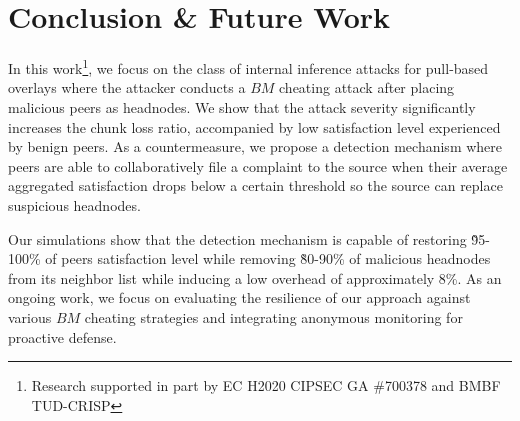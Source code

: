\section{Conclusion \& Future Work}
\label{sec:conclusion}
In this work\footnote{Research supported in part by EC H2020 CIPSEC GA \#700378 and BMBF TUD-CRISP}, we focus on the class of internal inference attacks for pull-based overlays where the attacker conducts a $BM$ cheating attack after placing malicious peers as headnodes.
We show that the attack severity significantly increases the chunk loss ratio, accompanied by low satisfaction level experienced by benign peers.
As a countermeasure, we propose a detection mechanism where peers are able to collaboratively file a complaint to the source when their average aggregated satisfaction drops below a certain threshold so the source can replace suspicious headnodes.

Our simulations show that the detection mechanism is capable of restoring \~95-100\% of peers satisfaction level while removing \~80-90\% of malicious headnodes from its neighbor list while inducing a low overhead of approximately 8\%.
As an ongoing work, we focus on evaluating the resilience of our approach against various $BM$ cheating strategies and integrating anonymous monitoring for proactive defense.
